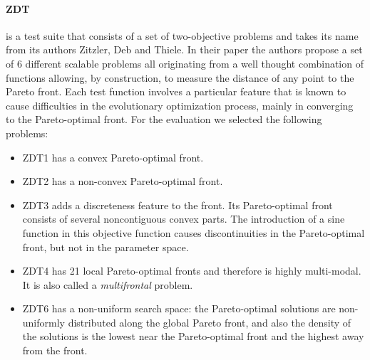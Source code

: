         \paragraph{ZDT}\cite{ZitzlerDT00} is a test suite that consists of a set of two-objective problems and takes its name from its authors Zitzler, Deb and Thiele. In their paper the authors propose a set of 6 different scalable problems all originating from a well thought combination of functions allowing, by construction, to measure the distance of any point to the Pareto front. Each test function involves a particular feature that is known to cause difficulties in the evolutionary optimization process, mainly in converging to the Pareto-optimal front.
        For the evaluation we selected the following problems:
        \begin{itemize}
            \item ZDT1 has a convex Pareto-optimal front.
            \item ZDT2 has a non-convex Pareto-optimal front.
            \item ZDT3 adds a discreteness feature to the front. Its Pareto-optimal front consists of several noncontiguous convex parts. The introduction of a sine function in this objective function causes discontinuities in the Pareto-optimal front, but not in the parameter space.
            \item ZDT4 has 21 local Pareto-optimal fronts and therefore is highly multi-modal. It is also called a \textit{multifrontal} problem.
            \item ZDT6 has a non-uniform search space: the Pareto-optimal solutions are non-uniformly distributed along the global Pareto front, and also the density of the solutions is the lowest near the Pareto-optimal front and the highest away from the front.
        \end{itemize}


